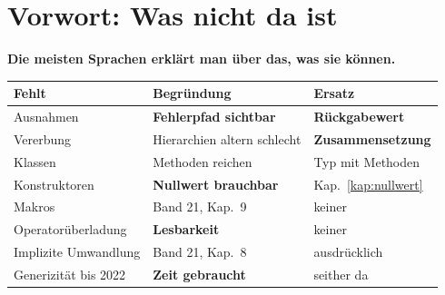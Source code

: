 \chapter*{Vorwort: Was nicht da ist}

\textbf{Die meisten Sprachen erklärt man über das, was sie können.} 

\begin{merksatz}
\begin{center}
{\small
\renewcommand{\arraystretch}{1.5}
\begin{tabular}{@{}P{2.8cm}P{3.2cm}P{2.4cm}@{}}
\toprule
\textbf{Fehlt} & \textbf{Begründung} & \textbf{Ersatz}\\
\midrule
Ausnahmen & \textbf{Fehlerpfad sichtbar} & \textbf{Rückgabewert}\\
Vererbung & \textcolor{akzent}{Hierarchien altern schlecht} & \textbf{Zusammen\-setzung}\\
Klassen & Methoden reichen & Typ mit Methoden\\
Konstruktoren & \textbf{Nullwert brauchbar} & \textcolor{gruen}{Kap.~\ref{kap:nullwert}}\\
Makros & \textcolor{akzent}{Band 21, Kap.~9} & keiner\\
Operator\-überladung & \textbf{Lesbarkeit} & keiner\\
Implizite Um\-wandlung & \textcolor{akzent}{Band 21, Kap.~8} & ausdrücklich\\
Generizität bis 2022 & \textcolor{akzent}{\textbf{Zeit gebraucht}} & \textcolor{gruen}{seither da}\\
\bottomrule
\end{tabular}}
\end{center}

\begin{center}
\begin{minipage}{0.88\textwidth}
\end{minipage}
\end{center}


\end{merksatz}
